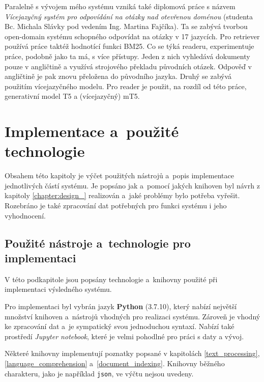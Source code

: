 Paralelně s vývojem mého systému vzniká také diplomová práce s názvem \textit{Vícejazyčný systém pro odpovídání na otázky nad otevřenou doménou} (studenta Bc. Michala Slávky pod vedením Ing. Martina Fajčíka). Ta se zabývá tvorbou open-domain systému schopného odpovídat na otázky v 17 jazycích. Pro retriever používá práce taktéž hodnotící funkci BM25. Co se týká readeru, experimentuje práce, podobně jako ta má, s více přístupy. Jeden z nich vyhledává dokumenty pouze v angličtině a využívá strojového překladu původních otázek. Odpověď v angličtině je pak znovu přeložena do původního jazyka. Druhý se zabývá použitím vícejazyčného modelu. Pro reader je použit, na rozdíl od této práce, generativní model T5 a (vícejazyčný) mT5.

\chapter{Implementace a~použité technologie}
\label{chapter:implementace}
Obsahem této kapitoly je výčet použitých nástrojů a~popis implementace jednotlivých částí systému. Je popsáno jak a~pomocí jakých knihoven byl návrh z kapitoly \ref{chapter:design_} realizován a~jaké problémy bylo potřeba vyřešit. Rozebráno je také zpracování dat potřebných pro funkci systému i jeho vyhodnocení.

\section{Použité nástroje a~technologie pro implementaci}
\label{pouzite_nastroje}
V této podkapitole jsou popsány technologie a~knihovny použité při implementaci výsledného systému.\par
Pro implementaci byl vybrán jazyk \textbf{Python} (3.7.10), který nabízí největší množství knihoven a~nástrojů vhodných pro realizaci systému. Zároveň je vhodný ke zpracování dat a~je sympatický svou jednoduchou syntaxí. Nabízí také prostředí \emph{Jupyter notebook}, které je velmi pohodlné pro práci s daty a vývoj.\par
Některé knihovny implementují poznatky popsané v kapitolách \ref{text_processing}, \ref{language_comprehension} a~\ref{document_indexing}. Knihovny běžného charakteru, jako je například \texttt{json}, ve výčtu nejsou uvedeny.

